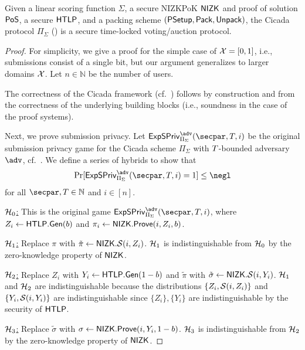 \begin{theorem}\label{thm:cicada}
    Given a linear scoring function $\Sigma$, a secure NIZKPoK $\mathsf{NIZK}$ and proof of solution ${\sf PoS}$, a secure $\mathsf{HTLP}$, and a packing scheme $(\mathsf{P}\mathsf{Setup},\allowbreak \mathsf{Pack},\allowbreak \mathsf{Unpack})$, the Cicada protocol $\Pi_\Sigma$ () is a secure time-locked voting/auction protocol. %
\end{theorem}

\begin{proof}
\def\Exp{\ensuremath{\mathsf{ExpSPriv}_{\Pi_\Sigma}^\adv(\secpar,\timeT,i)}}
    For simplicity, we give a proof for the simple case of $\mathcal{X}=[0,1]$, i.e., submissions consist of a single bit, but our argument generalizes to larger domains $\mathcal{X}$. Let $n \in \mathbb{N}$ be the number of users.

    The correctness of the Cicada framework (cf.~) follows by construction and from the correctness of the underlying building blocks (i.e., soundness in the case of the proof systems).
    
    Next, we prove submission privacy.
    Let $\Exp$ be the original submission privacy game for the Cicada scheme $\Pi_\Sigma$ with $T$-bounded adversary $\adv$, cf.~. We define a series of hybrids to show that 
    \[ 
        \Pr[\Exp = 1] \leq \negl 
    \]
    for all $\secpar,\timeT \in \mathbb{N}$ and $i\in[n]$.
    
    \underline{$\mathcal{H}_0$:} This is the original game $\Exp$, where $Z_i \gets \mathsf{HTLP}.{\sf Gen}(b)$ and $\pi_i \gets \mathsf{NIZK}.\mathsf{Prove}(i, Z_i, b)$.
    
    \underline{$\mathcal{H}_1$:} Replace $\pi$ with $\tilde{\pi} \gets {\sf NIZK}.\mathcal{S}(i, Z_i)$. $\mathcal{H}_1$ is indistinguishable from $\mathcal{H}_0$ by the zero-knowledge property of $\sf NIZK$.

    \underline{$\mathcal{H}_2$:} Replace $Z_i$ with $Y_i \gets \mathsf{HTLP}.{\sf Gen}(1-b)$ and $\tilde{\pi}$ with $\tilde{\sigma} \gets {\sf NIZK}.\mathcal{S}(i, Y_i)$. $\mathcal{H}_1$ and $\mathcal{H}_2$ are indistinguishable because the distributions $\{Z_i, \mathcal{S}(i, Z_i)\}$ and $\{Y_i, \mathcal{S}(i, Y_i)\}$ are indistinguishable since $\{Z_i\}, \{Y_i\}$ are indistinguishable by the security of $\mathsf{HTLP}$.

    \underline{$\mathcal{H}_3$:} Replace $\tilde{\sigma}$ with $\sigma \gets \mathsf{NIZK}.\mathsf{Prove}(i, Y_i, 1-b)$. $\mathcal{H}_3$ is indistinguishable from $\mathcal{H}_2$ by the zero-knowledge property of $\sf NIZK$.


\end{proof}
